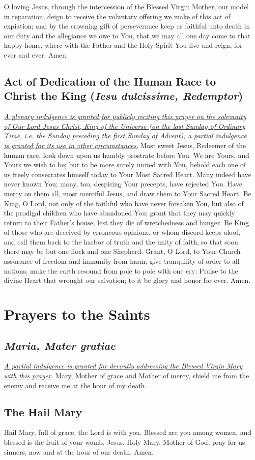 \documentclass[12pt]{article}
\newcommand{\prayersection}[1]{\section{#1}}
\newcommand{\prayertitle}[1]{\subsection{#1}}
\newcommand{\indulgencedprayertitle}[1]{\prayertitle{#1 \protect\kreuz}}
\newcommand{\foreign}[1]{\textsl{#1}}
\newcommand{\note}[1]{{\small{\textsl{#1}}}\newline}
\newcommand{\linkednote}[2]{\hyperlink{#1}{\note{#2}}}
\begin{document}
O loving Jesus, through the intercession of the Blessed Virgin Mother, our model in reparation, deign to receive the voluntary offering we make of this act of expiation;
and by the crowning gift of perseverance keep us faithful unto death in our duty and the allegiance we owe to You, that we may all one day come to that happy home, where with the Father and the Holy Spirit You live and reign, for ever and ever. Amen.

\indulgencedprayertitle{Act of Dedication of the Human Race to Christ the King (\foreign{Iesu dulcissime, Redemptor})}
\linkednote{grant2}{A plenary indulgence is granted for publicly reciting this prayer on the solemnity of Our Lord Jesus Christ, King of the Universe (on the last Sunday of Ordinary Time, i.e. the Sunday preceding the first Sunday of Advent);
a partial indulgence is granted for its use in other circumstances.}
Most sweet Jesus, Redeemer of the human race, look down upon us humbly prostrate before You.
We are Yours, and Yours we wish to be;
but to be more surely united with You, behold each one of us freely consecrates himself today to Your Most Sacred Heart.
Many indeed have never known You;
many, too, despising Your precepts, have rejected You.
Have mercy on them all, most merciful Jesus, and draw them to Your Sacred Heart.
Be King, O Lord, not only of the faithful who have never forsaken You, but also of the prodigal children who have abandoned You;
grant that they may quickly return to their Father's house, lest they die of wretchedness and hunger.
Be King of those who are deceived by erroneous opinions, or whom discord keeps aloof, and call them back to the harbor of truth and the unity of faith, so that soon there may be but one flock and one Shepherd.
Grant, O Lord, to Your Church assurance of freedom and immunity from harm;
give tranquility of order to all nations;
make the earth resound from pole to pole with one cry:
Praise to the divine Heart that wrought our salvation;
to it be glory and honor for ever.
Amen.

\newpage

\prayersection{Prayers to the Saints}
\indulgencedprayertitle{\foreign{Maria, Mater gratiae}}
\linkednote{grant17}{A partial indulgence is granted for devoutly addressing the Blessed Virgin Mary with this prayer.}
Mary, Mother of grace and Mother of mercy, shield me from the enemy and receive me at the hour of my death.

\prayertitle{The Hail Mary}
Hail Mary, full of grace, the Lord is with you.
Blessed are you among women, and blessed is the fruit of your womb, Jesus.
Holy Mary, Mother of God, pray for us sinners, now and at the hour of our death.
Amen.
\end{document}
